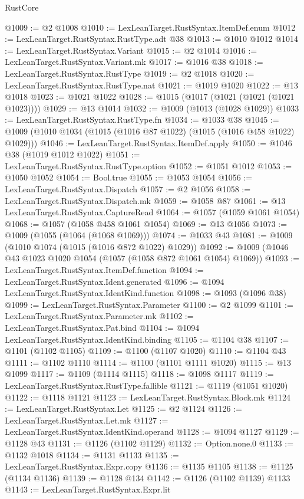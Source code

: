 \begin{lexlean}{RustCore}
\begin{coremodule}
@1009 := @2 @1008
@1010 := LexLeanTarget.RustSyntax.ItemDef.enum
@1012 := LexLeanTarget.RustSyntax.RustType.adt @38
@1013 := @1010 @1012
@1014 := LexLeanTarget.RustSyntax.Variant
@1015 := @2 @1014
@1016 := LexLeanTarget.RustSyntax.Variant.mk
@1017 := @1016 @38
@1018 := LexLeanTarget.RustSyntax.RustType
@1019 := @2 @1018
@1020 := LexLeanTarget.RustSyntax.RustType.nat
@1021 := @1019 @1020
@1022 := @13 @1018
@1023 := @1021 @1022
@1028 := @1015 (@1017 (@1021 (@1021 (@1021 @1023))))
@1029 := @13 @1014
@1032 := @1009 (@1013 (@1028 @1029))
@1033 := LexLeanTarget.RustSyntax.RustType.fn
@1034 := @1033 @38
@1045 := @1009 (@1010 @1034 (@1015 (@1016 @87 @1022) (@1015 (@1016 @458 @1022) @1029)))
@1046 := LexLeanTarget.RustSyntax.ItemDef.apply
@1050 := @1046 @38 (@1019 @1012 @1022)
@1051 := LexLeanTarget.RustSyntax.RustType.option
@1052 := @1051 @1012
@1053 := @1050 @1052
@1054 := Bool.true
@1055 := @1053 @1054
@1056 := LexLeanTarget.RustSyntax.Dispatch
@1057 := @2 @1056
@1058 := LexLeanTarget.RustSyntax.Dispatch.mk
@1059 := @1058 @87
@1061 := @13 LexLeanTarget.RustSyntax.CaptureRead
@1064 := @1057 (@1059 @1061 @1054)
@1068 := @1057 (@1058 @458 @1061 @1054)
@1069 := @13 @1056
@1073 := @1009 (@1055 (@1064 (@1068 @1069)))
@1074 := @1033 @43
@1081 := @1009 (@1010 @1074 (@1015 (@1016 @872 @1022) @1029))
@1092 := @1009 (@1046 @43 @1023 @1020 @1054 (@1057 (@1058 @872 @1061 @1054) @1069))
@1093 := LexLeanTarget.RustSyntax.ItemDef.function
@1094 := LexLeanTarget.RustSyntax.Ident.generated
@1096 := @1094 LexLeanTarget.RustSyntax.IdentKind.function
@1098 := @1093 (@1096 @38)
@1099 := LexLeanTarget.RustSyntax.Parameter
@1100 := @2 @1099
@1101 := LexLeanTarget.RustSyntax.Parameter.mk
@1102 := LexLeanTarget.RustSyntax.Pat.bind
@1104 := @1094 LexLeanTarget.RustSyntax.IdentKind.binding
@1105 := @1104 @38
@1107 := @1101 (@1102 @1105)
@1109 := @1100 (@1107 @1020)
@1110 := @1104 @43
@1111 := @1102 @1110
@1114 := @1100 (@1101 @1111 @1020)
@1115 := @13 @1099
@1117 := @1109 (@1114 @1115)
@1118 := @1098 @1117
@1119 := LexLeanTarget.RustSyntax.RustType.fallible
@1121 := @1119 (@1051 @1020)
@1122 := @1118 @1121
@1123 := LexLeanTarget.RustSyntax.Block.mk
@1124 := LexLeanTarget.RustSyntax.Let
@1125 := @2 @1124
@1126 := LexLeanTarget.RustSyntax.Let.mk
@1127 := LexLeanTarget.RustSyntax.IdentKind.operand
@1128 := @1094 @1127
@1129 := @1128 @43
@1131 := @1126 (@1102 @1129)
@1132 := Option.none.{0}
@1133 := @1132 @1018
@1134 := @1131 @1133
@1135 := LexLeanTarget.RustSyntax.Expr.copy
@1136 := @1135 @1105
@1138 := @1125 (@1134 @1136)
@1139 := @1128 @134
@1142 := @1126 (@1102 @1139) @1133
@1143 := LexLeanTarget.RustSyntax.Expr.lit

\end{coremodule}
\end{lexlean}
